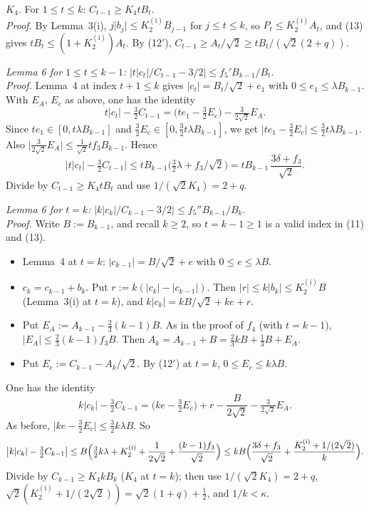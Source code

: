 \documentclass[11pt]{amsart}
\theoremstyle{remark}
\theoremstyle{plain}
\newcommand{\abs}[1]{\lvert #1\rvert}
\newcommand{\Kb}{K_2^{(\mathrm{i})}}
\begin{document}
\emph{$K_4$.} For $1\le t\le k$: $C_{t-1}\ge K_4tB_t$. \\
\emph{Proof.} By Lemma~3(i), $j\abs{b_j}\le\Kb B_{j-1}$ for $j\le t\le k$, so $P_t\le\Kb A_t$, and (13) gives $tB_t\le(1+\Kb)A_t$. By (12$'$), $C_{t-1}\ge A_t/\sqrt2\ge tB_t/(\sqrt2(2+q))$.

\emph{Lemma 6 for $1\le t\le k-1$:} $\bigl|t\abs{c_t}/C_{t-1}-3/2\bigr|\le f_5'B_{k-1}/B_t$. \\
\emph{Proof.} Lemma~4 at index $t+1\le k$ gives $\abs{c_t}=B_t/\sqrt2+e_1$ with $0\le e_1\le\lambda B_{k-1}$. With $E_A$, $E_c$ as above, one has the identity
\[
t\abs{c_t}-\tfrac32C_{t-1}=\bigl(te_1-\tfrac32E_c\bigr)-\tfrac3{2\sqrt2}E_A .
\]
Since $te_1\in[0,t\lambda B_{k-1}]$ and $\frac32E_c\in[0,\frac32t\lambda B_{k-1}]$, we get $\abs{te_1-\frac32E_c}\le\frac32t\lambda B_{k-1}$. Also $\abs{\frac3{2\sqrt2}E_A}\le\frac1{\sqrt2}tf_3B_{k-1}$. Hence
\[
\bigl|t\abs{c_t}-\tfrac32C_{t-1}\bigr|\le tB_{k-1}\bigl(\tfrac32\lambda+f_3/\sqrt2\bigr)=tB_{k-1}\,\frac{3\delta+f_3}{\sqrt2}.
\]
Divide by $C_{t-1}\ge K_4tB_t$ and use $1/(\sqrt2K_4)=2+q$.

\emph{Lemma 6 for $t=k$:} $\bigl|k\abs{c_k}/C_{k-1}-3/2\bigr|\le f_5''B_{k-1}/B_k$. \\
\emph{Proof.} Write $B:=B_{k-1}$, and recall $k\ge2$, so $t=k-1\ge1$ is a valid index in (11) and (13).
\begin{itemize}[leftmargin=*]
\item Lemma~4 at $t=k$: $\abs{c_{k-1}}=B/\sqrt2+e$ with $0\le e\le\lambda B$.
\item $c_k=c_{k-1}+b_k$. Put $r:=k(\abs{c_k}-\abs{c_{k-1}})$. Then $\abs r\le k\abs{b_k}\le\Kb B$ (Lemma~3(i) at $t=k$), and $k\abs{c_k}=kB/\sqrt2+ke+r$.
\item Put $E_A:=A_{k-1}-\frac23(k-1)B$. As in the proof of $f_4$ (with $t=k-1$), $\abs{E_A}\le\frac23(k-1)f_3B$. Then $A_k=A_{k-1}+B=\frac23kB+\frac13B+E_A$.
\item Put $E_c:=C_{k-1}-A_k/\sqrt2$. By (12$'$) at $t=k$, $0\le E_c\le k\lambda B$.
\end{itemize}
One has the identity
\[
k\abs{c_k}-\tfrac32C_{k-1}=\bigl(ke-\tfrac32E_c\bigr)+r-\frac B{2\sqrt2}-\tfrac3{2\sqrt2}E_A .
\]
As before, $\abs{ke-\frac32E_c}\le\frac32k\lambda B$. So
\[
\bigl|k\abs{c_k}-\tfrac32C_{k-1}\bigr|\le B\Bigl(\tfrac32k\lambda+\Kb+\frac1{2\sqrt2}+\frac{(k-1)f_3}{\sqrt2}\Bigr)\le kB\Bigl(\frac{3\delta+f_3}{\sqrt2}+\frac{\Kb+1/(2\sqrt2)}k\Bigr).
\]
Divide by $C_{k-1}\ge K_4kB_k$ ($K_4$ at $t=k$); then use $1/(\sqrt2K_4)=2+q$, $\sqrt2(\Kb+1/(2\sqrt2))=\sqrt2(1+q)+\frac12$, and $1/k<\kappa$.
\end{document}
